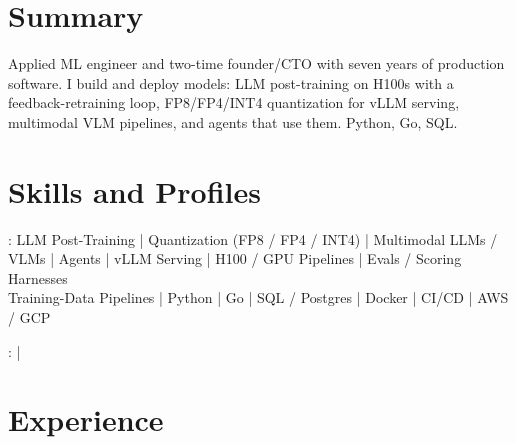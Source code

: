 \documentclass[print]{jack-resume}
\begin{document}
\pagecolor{darkmodeBackground}


\begin{minipage}[t][1cm][t]{.03\textwidth}
    \hfill
\end{minipage}

\section{Summary}
Applied ML engineer and two-time founder/CTO with seven years of production software. I build and deploy models: LLM post-training on H100s with a feedback-retraining loop, FP8/FP4/INT4 quantization for vLLM serving, multimodal VLM pipelines, and agents that use them. Python, Go, SQL.
\sectionsep

\section{Skills and Profiles}
:
LLM Post-Training \hfill | \hfill
Quantization (FP8 / FP4 / INT4) \hfill | \hfill
Multimodal LLMs / VLMs \hfill | \hfill
Agents \hfill | \hfill
vLLM Serving \hfill | \hfill
H100 / GPU Pipelines \hfill | \hfill
Evals / Scoring Harnesses \\
\hspace{1.0cm} Training-Data Pipelines \hfill | \hfill
Python \hfill | \hfill
Go \hfill | \hfill
SQL / Postgres \hfill | \hfill
Docker \hfill | \hfill
CI/CD \hfill | \hfill
AWS / GCP \\

\raggedright{
    :
      \href{https://www.linkedin.com/in/jack-sturtevant/}{ \ExternalLink} |
     \href{https://github.com/jacksturt}{ \ExternalLink}}

\section{Experience}
\end{document}
